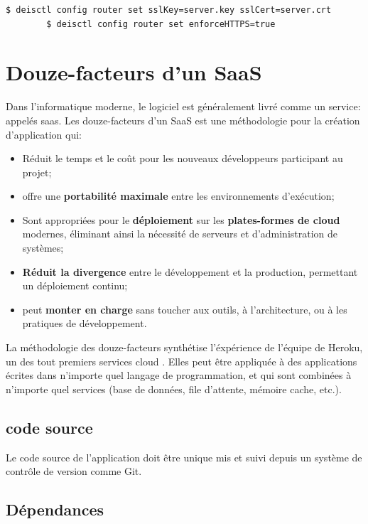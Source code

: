 	\begin{lstlisting}[language=bash,caption=Activation du protocole SSL]
		$ deisctl config router set sslKey=server.key sslCert=server.crt
		$ deisctl config router set enforceHTTPS=true
	\end{lstlisting}	

\chapter{Douze-facteurs d'un SaaS}
\label{annexe:12factors}

Dans l'informatique moderne, le logiciel est généralement livré comme un service: appelés \acrshort{saas}. Les douze-facteurs d'un SaaS est une méthodologie pour la création d'application qui:

\begin{itemize}
	\item Réduit le temps et le coût pour les nouveaux développeurs participant au projet;
	\item offre une \textbf{portabilité maximale} entre les environnements d'exécution;
	\item Sont appropriées pour le \textbf{déploiement} sur les \textbf{plates-formes de cloud} modernes, éliminant ainsi la nécessité de serveurs et d'administration de systèmes;
	\item \textbf{Réduit la divergence} entre le développement et la production, permettant un déploiement continu;
	\item peut \textbf{monter en charge} sans toucher aux outils, à l'architecture, ou à les pratiques de développement.
\end{itemize}


La méthodologie des douze-facteurs synthétise l'éxpérience de l'équipe de Heroku, un des tout premiers services cloud \cite{12-factors}. Elles peut être appliquée à des applications écrites dans n'importe quel langage de programmation, et qui sont combinées à n'importe quel services (base de données, file d'attente, mémoire cache, etc.).


\section*{code source}

Le code source de l'application doit être unique mis et suivi depuis un système de contrôle de version comme Git.

\section*{Dépendances}

